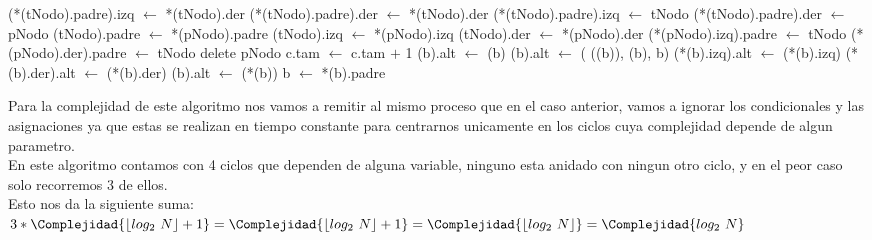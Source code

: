 \begin{Algoritmos}
{				\EndIf
				 
					\State *(*(tNodo).padre).izq $\gets$ *(tNodo).der 
				\Else
					\State *(*(tNodo).padre).der $\gets$ *(tNodo).der 
				\EndIf
				 
					\State *(*(tNodo).padre).izq $\gets$ tNodo 
				\Else
					\State *(*(tNodo).padre).der $\gets$ pNodo 
				\EndIf
				\State *(tNodo).padre $\gets$ *(pNodo).padre 
				\State *(tNodo).izq $\gets$ *(pNodo).izq 
				\State *(tNodo).der $\gets$ *(pNodo).der 
				\State *(*(pNodo).izq).padre $\gets$ tNodo 
				\State *(*(pNodo).der).padre $\gets$ tNodo 
				\State delete pNodo 
			\EndIf
		\State c.tam $\gets$ c.tam $+$ 1
		 
			\State *(b).alt $\gets$ (b) 
			 
				\State *(b).alt $\gets$ (
				((b)), (b), b) 
				\State *(*(b).izq).alt $\gets$ (*(b).izq) 
				\State *(*(b).der).alt $\gets$ (*(b).der) 
				\State *(b).alt $\gets$ (*(b)) 
			\EndIf
			\State b $\gets$ *(b).padre 
		\EndWhile
		\EndIf	
	\EndIf
	
	}{}{
	Para la complejidad de este algoritmo nos vamos a remitir al mismo proceso que en el caso anterior, vamos a ignorar los condicionales y las asignaciones ya que estas se realizan en tiempo constante para centrarnos unicamente en los ciclos cuya complejidad depende de algun parametro.\\
	En este algoritmo contamos con 4 ciclos que dependen de alguna variable, ninguno esta anidado con ningun otro ciclo, y en el peor caso solo recorremos 3 de ellos.\\
	Esto nos da la siguiente suma:\\
	$3 * \Complejidad{\lfloor log_2\ N\rfloor + 1} =\newline
	\Complejidad{\lfloor log_2\ N\rfloor + 1} =\newline
	\Complejidad{\lfloor log_2\ N\rfloor} = \Complejidad{log_2\ N}$
	
	}


\end{Algoritmos}
